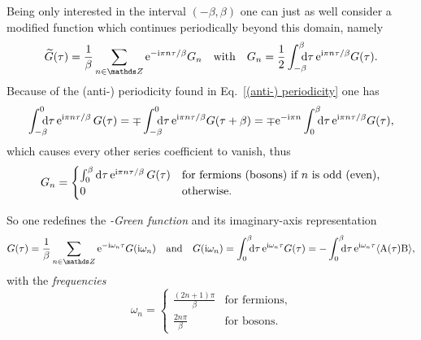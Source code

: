 Being only interested in the interval $(-\beta, \beta)$ one can just as well
consider a modified  function which continues periodically beyond
this domain, namely
%
\begin{equation*}
    \widetilde G(\tau) = \frac 1 \beta \sum_{n \in \mathds Z}
        \E^{-\I \pi n \tau / \beta} G_n
    \quad \text{with} \quad
    G_n = \frac 1 2 \int \from{-\beta} \till \beta \D \tau \,
        \E^{\I \pi n \tau / \beta} G(\tau).
\end{equation*}
%
Because of the (anti-) periodicity found in Eq.~\ref{(anti-) periodicity} one
has
%
\begin{equation*}
    \int \from{-\beta} \till 0 \D \tau \, \E^{\I \pi n \tau / \beta} \, G(\tau)
    = \mp \int \from{-\beta} \till 0 \D \tau \,
        \E^{\I \pi n \tau / \beta} G(\tau + \beta)
    = \mp \E^{-\I \pi n} \int \from 0 \till \beta \D \tau \,
        \E^{\I \pi n \tau / \beta} G(\tau),
\end{equation*}
%
which causes every other series coefficient to vanish, thus
%
\begin{equation*}
    G_n =
    \begin{cases}
        \int_0^\beta \mathrm d \tau \, \mathrm e^{\mathrm i \pi n \tau / \beta} \, G(\tau)
        & \text{for fermions (bosons) if $n$ is odd (even),} \\ 0
        & \text{otherwise.}
    \end{cases}
\end{equation*}

So one redefines the \emph{-Green function} and its
imaginary-axis representation
%
\begin{equation} \label{Matsubara-Green function}
    G(\tau) = \frac 1 \beta \sum_{n \in \mathds Z}
        \E^{-\I \omega_n \tau} G(\I \omega_n)
    \quad \text{and} \quad
    G(\I \omega_n) = \int \from 0 \till \beta \D \tau \,
        \E^{\I \omega_n \tau} G(\tau)
    = -\int \from 0 \till \beta \D \tau \,
        \E^{\I \omega_n \tau} \av{\op A(\tau) \op B},
\end{equation}
%
with the \emph{ frequencies}
%
\begin{equation*}
    \omega_n =
    \begin{cases}
        \frac{(2 n + 1) \pi} \beta & \text{for fermions}, \\
        \frac{2 n \pi} \beta & \text{for bosons.}
    \end{cases}
\end{equation*}

